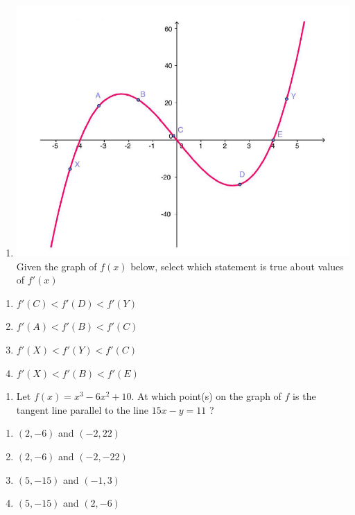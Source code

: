 \begin{enumerate}
\def\labelenumi{\arabic{enumi}.}
\tightlist
\item
  \includegraphics{graph1.PNG} Given the graph of \(f(x)\) below, select
  which statement is true about values of \(f'(x)\)
\end{enumerate}

\begin{enumerate}
\def\labelenumi{(\Alph{enumi})}
\tightlist
\item
  \(f'(C) < f'(D) < f'(Y)\)
\item
  \(f'(A) < f'(B) < f'(C)\)
\item
  \(f'(X) < f'(Y) < f'(C)\)
\item
  \(f'(X) < f'(B) < f'(E)\)
\end{enumerate}

\begin{enumerate}
\def\labelenumi{\arabic{enumi}.}
\tightlist
\item
  Let \(f(x)=x^{3}-6 x^{2}+10\). At which point(s) on the graph of \(f\)
  is the tangent line parallel to the line \(15 x-y=11\) ?
\end{enumerate}

\begin{enumerate}
\def\labelenumi{(\Alph{enumi})}
\item
  \((2,-6)\) and \((-2,22)\)
\item
  \((2,-6)\) and \((-2,-22)\)
\item
  \((5,-15)\) and \((-1,3)\)
\item
  \((5,-15)\) and \((2,-6)\)
\end{enumerate}

